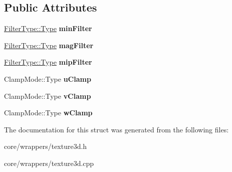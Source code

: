 \subsection*{Public Attributes}
\begin{DoxyCompactItemize}
\item 
\hypertarget{struct_tempest_1_1_texture3d_1_1_sampler_a5e0962b663c95b91a3f1af4b73a13559}{\hyperlink{struct_tempest_1_1_abstract_texture_1_1_filter_type_aa28dcbdc63244fe43cfb7258f6996978}{Filter\+Type\+::\+Type} {\bfseries min\+Filter}}\label{struct_tempest_1_1_texture3d_1_1_sampler_a5e0962b663c95b91a3f1af4b73a13559}

\item 
\hypertarget{struct_tempest_1_1_texture3d_1_1_sampler_a110b8b1b2cb7b2465c5ce9364ba895c6}{\hyperlink{struct_tempest_1_1_abstract_texture_1_1_filter_type_aa28dcbdc63244fe43cfb7258f6996978}{Filter\+Type\+::\+Type} {\bfseries mag\+Filter}}\label{struct_tempest_1_1_texture3d_1_1_sampler_a110b8b1b2cb7b2465c5ce9364ba895c6}

\item 
\hypertarget{struct_tempest_1_1_texture3d_1_1_sampler_a573c8c413110ceb51fdbe2ea3a53dfa5}{\hyperlink{struct_tempest_1_1_abstract_texture_1_1_filter_type_aa28dcbdc63244fe43cfb7258f6996978}{Filter\+Type\+::\+Type} {\bfseries mip\+Filter}}\label{struct_tempest_1_1_texture3d_1_1_sampler_a573c8c413110ceb51fdbe2ea3a53dfa5}

\item 
\hypertarget{struct_tempest_1_1_texture3d_1_1_sampler_ad91f6f9b8b84724572bdf90f3d4305b9}{Clamp\+Mode\+::\+Type {\bfseries u\+Clamp}}\label{struct_tempest_1_1_texture3d_1_1_sampler_ad91f6f9b8b84724572bdf90f3d4305b9}

\item 
\hypertarget{struct_tempest_1_1_texture3d_1_1_sampler_a99d51d94815a7f264a44f4eda98add1f}{Clamp\+Mode\+::\+Type {\bfseries v\+Clamp}}\label{struct_tempest_1_1_texture3d_1_1_sampler_a99d51d94815a7f264a44f4eda98add1f}

\item 
\hypertarget{struct_tempest_1_1_texture3d_1_1_sampler_ac46c67ace29720db483721405756bfc8}{Clamp\+Mode\+::\+Type {\bfseries w\+Clamp}}\label{struct_tempest_1_1_texture3d_1_1_sampler_ac46c67ace29720db483721405756bfc8}

\end{DoxyCompactItemize}


The documentation for this struct was generated from the following files\+:\begin{DoxyCompactItemize}
\item 
core/wrappers/texture3d.\+h\item 
core/wrappers/texture3d.\+cpp\end{DoxyCompactItemize}
